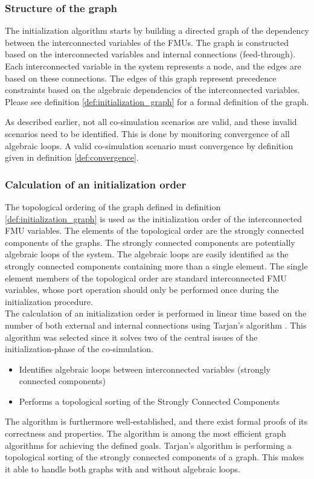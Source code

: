 \subsubsection{Structure of the graph}
The initialization algorithm starts by building a directed graph of the dependency between the interconnected variables of the FMUs. The graph is constructed based on the interconnected variables and internal connections (feed-through). Each interconnected variable in the system represents a node, and the edges are based on these connections. The edges of this graph represent precedence constraints based on the algebraic dependencies of the interconnected variables. Please see definition \ref{def:initialization_graph} for a formal definition of the graph.

As described earlier, not all co-simulation scenarios are valid, and these invalid scenarios need to be identified. This is done by monitoring convergence of all algebraic loops. A valid co-simulation scenario must convergence by definition given in definition \ref{def:convergence}.

\subsubsection{Calculation of an initialization order}
The topological ordering of the graph defined in definition \ref{def:initialization_graph} is used as the initialization order of the interconnected FMU variables. The elements of the topological order are the strongly connected components of the graphs. The strongly connected components are potentially algebraic loops of the system. The algebraic loops are easily identified as the strongly connected components containing more than a single element. The single element members of the topological order are standard interconnected FMU variables, whose port operation should only be performed once during the initialization procedure. \\
The calculation of an initialization order is performed in linear time based on the number of both external and internal connections using Tarjan's algorithm \cite{tarjan_1972}. This algorithm was selected since it solves two of the central issues of the initialization-phase of the co-simulation.
\begin{itemize}
    \item Identifies algebraic loops between interconnected variables (strongly connected components)
    \item Performs a topological sorting of the Strongly Connected Components
\end{itemize}
The algorithm is furthermore well-established, and there exist formal proofs of its correctness and properties\cite{stefanMerz}. The algorithm is among the most efficient graph algorithms for achieving the defined goals.  
Tarjan's algorithm is performing a topological sorting of the strongly connected components of a graph. This makes it able to handle both graphs with and without algebraic loops.

